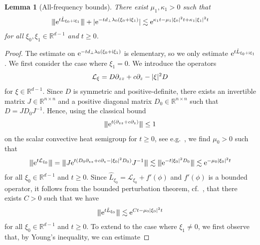 \documentclass[12pt,oneside,a4paper,reqno]{amsart}
\numberwithin{equation}{section}
\newtheorem{lemma}[theorem]{Lemma}
\theoremstyle{definition}
\theoremstyle{remark}
\newcommand{\cL}{{\mathcal L}}
\newcommand{\bbR}{{\mathbb R}}
\newcommand{\re}{{\rm e}}
\newcommand{\ri}{{\rm i}}
\DeclarePairedDelimiter{\abs}{\lvert}{\rvert}
\DeclarePairedDelimiter{\tnorm}{\lvert\kern-0.25ex\lvert\kern-0.25ex\lvert}{\rvert\kern-0.25ex\rvert\kern-0.25ex\rvert}
\begin{document}
\begin{lemma}[All-frequency bounds]
\label{lem:semigroup_allfreq}
There exist $\mu_1,\kappa_1 >0$ such that
\begin{align}
    \label{eq:semigroup_allfreq}
    \tnorm{\re^{t\hat{L}_{\xi_0 + \ri \xi_1}}} + \abs{\re^{-td_{\bot}\lambda_0(\xi_0 + \ri \xi_1)}} \lesssim \re^{\kappa_1 t - \mu_1 \abs{\xi_0}^2 t + \kappa_1\abs{\xi_1}^2t}
\end{align}
for all $\xi_0,\xi_1 \in \bbR^{d-1}$ and $t \geq 0$.
\end{lemma}
\begin{proof}
    The estimate on $\re^{-t d_{\bot} \lambda_0(\xi_0 + \ri \xi_1)}$ is elementary, so we only estimate $\re^{t\hat{L}_{\xi_0 + \ri \xi_1}}$.
    We first consider the case where $\xi_1 = 0$.
    We introduce the operators 
    \begin{equation*}
        \cL_{\xi} = D \partial_{zz} + c\partial_z - \abs{\xi}^2 D
    \end{equation*}
    for $\xi \in \bbR^{d-1}$. Since $D$ is symmetric and positive-definite, there exists an invertible matrix $J \in \bbR^{n \times n}$ and a positive diagonal matrix $D_0 \in \bbR^{n \times n}$ such that $D = J D_0 J^{-1}$. Hence, using the classical bound 
    \begin{align*} \tnorm{\re^{t \left(\partial_{zz} + c \partial_z\right)}} \leq 1\end{align*} 
    on the scalar convective heat semigroup for $t \geq 0$, see e.g.~\cite[Proposition~3.6]{derijk_nonlinear_2024}, we find $\mu_0 > 0$ such that
    \begin{align*} 
        \tnorm{\re^{t\cL_{\xi_0}}} 
        = \tnorm{J\re^{t(D_0 \partial_{zz} + c \partial_z - \abs{\xi_0}^2 D_0)}J^{-1}}
        \lesssim \tnorm{\re^{-t \abs{\xi_0}^2 D_0}}
        \lesssim \re^{-\mu_0 \abs{\xi_0}^2 t}
    \end{align*}
    for all $\xi_0 \in \bbR^{d-1}$ and $t \geq 0$.
    Since $\hat{L}_{\xi_0} = \cL_{\xi_0} + f'(\phi)$ and $f'(\phi)$ is a bounded operator, it follows from the bounded perturbation theorem, cf.~\cite[Theorem III.1.3]{engel_oneparameter_2000}, that there exists $C > 0$ such that we have
    \begin{align}
        \label{eq:semigroup_allfreqreal}
        \tnorm{\re^{t\hat{L}_{\xi_0}}}\lesssim \re^{Ct -\mu_0 \abs{\xi_0}^2t}
    \end{align}
    for all $\xi_0 \in \bbR^{d-1}$ and $t \geq 0$.
    To extend to the case where $\xi_1 \neq 0$, we first observe that, by Young's inequality, we can estimate

\end{proof}
\end{document}
